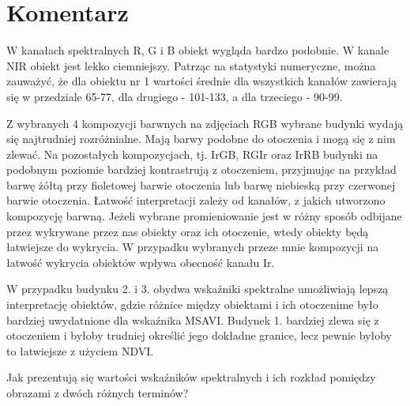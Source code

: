 \documentclass[a4paper,12pt]{article}  %
\begin{document}
\newpage
\section{Komentarz}

W kanałach spektralnych R, G i B obiekt wygląda bardzo podobnie. W kanale NIR obiekt jest lekko ciemniejszy. Patrząc na statystyki numeryczne, można zauważyć, że dla obiektu nr 1 wartości średnie dla wszystkich kanałów zawierają się w przedziale 65-77, dla drugiego - 101-133, a dla trzeciego - 90-99.

Z wybranych 4 kompozycji barwnych na zdjęciach RGB wybrane budynki wydają się najtrudniej rozróżnialne. Mają barwy podobne do otoczenia i mogą się z nim zlewać. Na pozostałych kompozycjach, tj. IrGB, RGIr oraz IrRB budynki na podobnym poziomie bardziej kontrastrują z otoczeniem, przyjmując na przykład barwę żółtą przy fioletowej barwie otoczenia lub barwę niebieską przy czerwonej barwie otoczenia. Łatwość interpretacji zależy od kanałów, z jakich utworzono kompozycję barwną. Jeżeli wybrane promieniowanie jest w różny sposób odbijane przez wykrywane przez nas obiekty oraz ich otoczenie, wtedy obiekty będą łatwiejsze do wykrycia. W przypadku wybranych przeze mnie kompozycji na łatwość wykrycia obiektów wpływa obecność kanału Ir.

W przypadku budynku 2. i 3. obydwa wskaźniki spektralne umożliwiają lepszą interpretację obiektów, gdzie różnice między obiektami i ich otoczenime było bardziej uwydatnione dla wskaźnika MSAVI. Budynek 1. bardziej zlewa się z otoczeniem i byłoby trudniej określić jego dokładne granice, lecz pewnie byłoby to łatwiejsze z użyciem NDVI.

Jak prezentują się wartości wskaźników spektralnych i ich rozkład pomiędzy obrazami z dwóch różnych terminów?
\end{document}
